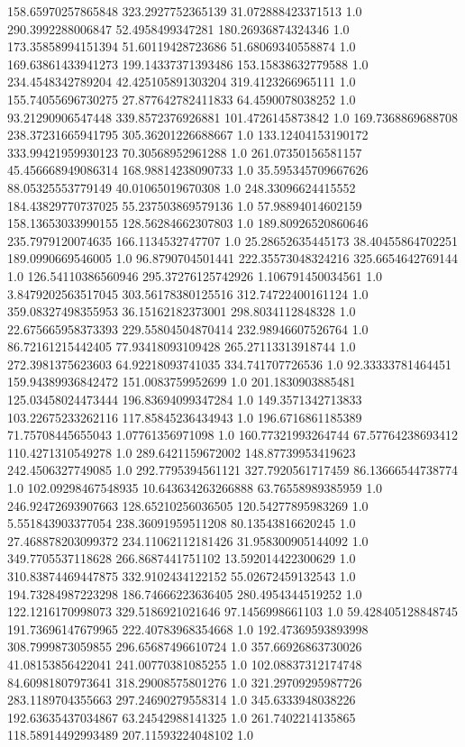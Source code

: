 158.65970257865848	323.2927752365139	31.072888423371513	1.0
290.3992288006847	52.4958499347281	180.26936874324346	1.0
173.35858994151394	51.60119428723686	51.68069340558874	1.0
169.63861433941273	199.14337371393486	153.15838632779588	1.0
234.4548342789204	42.425105891303204	319.4123266965111	1.0
155.74055696730275	27.877642782411833	64.4590078038252	1.0
93.21290906547448	339.8572376926881	101.4726145873842	1.0
169.7368869688708	238.37231665941795	305.36201226688667	1.0
133.12404153190172	333.99421959930123	70.30568952961288	1.0
261.07350156581157	45.456668949086314	168.98814238090733	1.0
35.595345709667626	88.05325553779149	40.01065019670308	1.0
248.33096624415552	184.43829770737025	55.237503869579136	1.0
57.98894014602159	158.13653033990155	128.56284662307803	1.0
189.80926520860646	235.7979120074635	166.1134532747707	1.0
25.28652635445173	38.40455864702251	189.0990669546005	1.0
96.8790704501441	222.35573048324216	325.6654642769144	1.0
126.54110386560946	295.37276125742926	1.106791450034561	1.0
3.8479202563517045	303.56178380125516	312.74722400161124	1.0
359.08327498355953	36.15162182373001	298.8034112848328	1.0
22.675665958373393	229.55804504870414	232.98946607526764	1.0
86.72161215442405	77.93418093109428	265.27113313918744	1.0
272.3981375623603	64.92218093741035	334.741707726536	1.0
92.33333781464451	159.94389936842472	151.0083759952699	1.0
201.1830903885481	125.03458024473444	196.83694099347284	1.0
149.3571342713833	103.22675233262116	117.85845236434943	1.0
196.6716861185389	71.75708445655043	1.07761356971098	1.0
160.77321993264744	67.57764238693412	110.4271310549278	1.0
289.6421159672002	148.87739953419623	242.4506327749085	1.0
292.7795394561121	327.7920561717459	86.13666544738774	1.0
102.09298467548935	10.643634263266888	63.76558989385959	1.0
246.92472693907663	128.65210256036505	120.54277895983269	1.0
5.551843903377054	238.36091959511208	80.13543816620245	1.0
27.468878203099372	234.11062112181426	31.958300905144092	1.0
349.7705537118628	266.8687441751102	13.592014422300629	1.0
310.83874469447875	332.9102434122152	55.02672459132543	1.0
194.73284987223298	186.74666223636405	280.4954344519252	1.0
122.1216170998073	329.5186921021646	97.1456998661103	1.0
59.428405128848745	191.73696147679965	222.40783968354668	1.0
192.47369593893998	308.7999873059855	296.65687496610724	1.0
357.66926863730026	41.08153856422041	241.00770381085255	1.0
102.08837312174748	84.60981807973641	318.29008575801276	1.0
321.29709295987726	283.1189704355663	297.24690279558314	1.0
345.6333948038226	192.63635437034867	63.24542988141325	1.0
261.7402214135865	118.58914492993489	207.11593224048102	1.0
